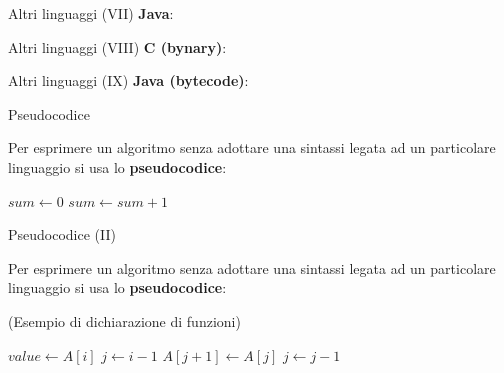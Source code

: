 \begin{frame}{Altri linguaggi (VII)}
  \textbf{Java}:
  \begin{center}
  \end{center}
\end{frame}

\begin{frame}{Altri linguaggi (VIII)}
  \textbf{C (bynary)}:
  \begin{center}
  \end{center}
\end{frame}

\begin{frame}{Altri linguaggi (IX)}
  \textbf{Java (bytecode)}:
  \begin{center}
  \end{center}
\end{frame}

\begin{frame}{Pseudocodice}

  Per esprimere un algoritmo senza adottare una sintassi legata ad un particolare
  linguaggio si usa lo \textbf{pseudocodice}:
    \begin{algorithmic}[1]
      
      \State $sum \gets 0$
	    \State $sum \gets sum + 1$ 
	  \EndIf
	\EndFor
      \EndFor
    \end{algorithmic}

\end{frame}

\begin{frame}{Pseudocodice (II)}

  Per esprimere un algoritmo senza adottare una sintassi legata ad un particolare
  linguaggio si usa lo \textbf{pseudocodice}:
  
  (Esempio di dichiarazione di funzioni)
  \begin{algorithmic}[H]
	\State $value \gets A[i]$
	\State $j \gets i - 1$
	  \State $A[j + 1] \gets A[j]$
	  \State $j \gets j-1$
	\EndWhile
      \EndFor
    \EndFunction
  \end{algorithmic}

\end{frame}